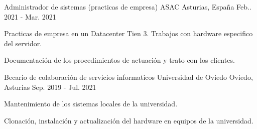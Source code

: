 

\begin{cventries}

  \cventry
    {Administrador de sistemas (practicas de empresa)} %
    {ASAC} %
    {Asturias, España} %
    {Feb.. 2021 - Mar. 2021} %
    {
      \begin{cvitems} %
        \item {Practicas de empresa en un Datacenter Tien 3. Trabajos con hardware especifico del servidor.}
        \item {Documentación de los procedimientos de actuación y trato con los clientes.}
      \end{cvitems}
    }

  \cventry
    {Becario de colaboración de servicios informaticos} %
    {Universidad de Oviedo} %
    {Oviedo, Asturias} %
    {Sep. 2019 - Jul. 2021} %
    {
      \begin{cvitems} %
        \item {Mantenimiento de los sistemas locales de la universidad.}
        \item {Clonación, instalación y actualización del hardware en equipos de la universidad.}
      \end{cvitems}
    }

\end{cventries}
